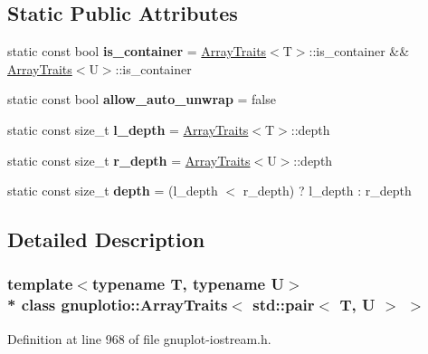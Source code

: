 \subsection*{Static Public Attributes}
\begin{DoxyCompactItemize}
\item 
static const bool {\bfseries is\+\_\+container} = \hyperlink{classgnuplotio_1_1_array_traits}{Array\+Traits}$<$T$>$\+::is\+\_\+container \&\& \hyperlink{classgnuplotio_1_1_array_traits}{Array\+Traits}$<$U$>$\+::is\+\_\+container\hypertarget{classgnuplotio_1_1_array_traits_3_01std_1_1pair_3_01_t_00_01_u_01_4_01_4_a8656ab8094037d88b470f718ff7197e0}{}\label{classgnuplotio_1_1_array_traits_3_01std_1_1pair_3_01_t_00_01_u_01_4_01_4_a8656ab8094037d88b470f718ff7197e0}

\item 
static const bool {\bfseries allow\+\_\+auto\+\_\+unwrap} = false\hypertarget{classgnuplotio_1_1_array_traits_3_01std_1_1pair_3_01_t_00_01_u_01_4_01_4_afff9ebffb39ab8660bb59ffcc7d8a2e5}{}\label{classgnuplotio_1_1_array_traits_3_01std_1_1pair_3_01_t_00_01_u_01_4_01_4_afff9ebffb39ab8660bb59ffcc7d8a2e5}

\item 
static const size\+\_\+t {\bfseries l\+\_\+depth} = \hyperlink{classgnuplotio_1_1_array_traits}{Array\+Traits}$<$T$>$\+::depth\hypertarget{classgnuplotio_1_1_array_traits_3_01std_1_1pair_3_01_t_00_01_u_01_4_01_4_ae8be9661c88a8970da3d87c1afc063dc}{}\label{classgnuplotio_1_1_array_traits_3_01std_1_1pair_3_01_t_00_01_u_01_4_01_4_ae8be9661c88a8970da3d87c1afc063dc}

\item 
static const size\+\_\+t {\bfseries r\+\_\+depth} = \hyperlink{classgnuplotio_1_1_array_traits}{Array\+Traits}$<$U$>$\+::depth\hypertarget{classgnuplotio_1_1_array_traits_3_01std_1_1pair_3_01_t_00_01_u_01_4_01_4_a1b7e7f8976a5d0ed20b93ede3e25a546}{}\label{classgnuplotio_1_1_array_traits_3_01std_1_1pair_3_01_t_00_01_u_01_4_01_4_a1b7e7f8976a5d0ed20b93ede3e25a546}

\item 
static const size\+\_\+t {\bfseries depth} = (l\+\_\+depth $<$ r\+\_\+depth) ? l\+\_\+depth \+: r\+\_\+depth\hypertarget{classgnuplotio_1_1_array_traits_3_01std_1_1pair_3_01_t_00_01_u_01_4_01_4_a11b3be89ac9506fcfcceb318acc7e2bf}{}\label{classgnuplotio_1_1_array_traits_3_01std_1_1pair_3_01_t_00_01_u_01_4_01_4_a11b3be89ac9506fcfcceb318acc7e2bf}

\end{DoxyCompactItemize}


\subsection{Detailed Description}
\subsubsection*{template$<$typename T, typename U$>$\\*
class gnuplotio\+::\+Array\+Traits$<$ std\+::pair$<$ T, U $>$ $>$}



Definition at line 968 of file gnuplot-\/iostream.\+h.

